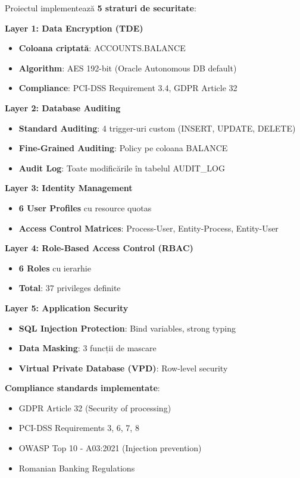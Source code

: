 \documentclass[12pt,a4paper]{article}
\begin{document}
Proiectul implementează \textbf{5 straturi de securitate}:

\textbf{Layer 1: Data Encryption (TDE)}
\begin{itemize}
    \item \textbf{Coloana criptată}: ACCOUNTS.BALANCE
    \item \textbf{Algorithm}: AES 192-bit (Oracle Autonomous DB default)
    \item \textbf{Compliance}: PCI-DSS Requirement 3.4, GDPR Article 32
\end{itemize}

\textbf{Layer 2: Database Auditing}
\begin{itemize}
    \item \textbf{Standard Auditing}: 4 trigger-uri custom (INSERT, UPDATE, DELETE)
    \item \textbf{Fine-Grained Auditing}: Policy pe coloana BALANCE
    \item \textbf{Audit Log}: Toate modificările în tabelul AUDIT\_LOG
\end{itemize}

\textbf{Layer 3: Identity Management}
\begin{itemize}
    \item \textbf{6 User Profiles} cu resource quotas
    \item \textbf{Access Control Matrices}: Process-User, Entity-Process, Entity-User
\end{itemize}

\textbf{Layer 4: Role-Based Access Control (RBAC)}
\begin{itemize}
    \item \textbf{6 Roles} cu ierarhie
    \item \textbf{Total}: 37 privileges definite
\end{itemize}

\textbf{Layer 5: Application Security}
\begin{itemize}
    \item \textbf{SQL Injection Protection}: Bind variables, strong typing
    \item \textbf{Data Masking}: 3 funcții de mascare
    \item \textbf{Virtual Private Database (VPD)}: Row-level security
\end{itemize}

\textbf{Compliance standards implementate}:
\begin{itemize}
    \item[$\checkmark$] GDPR Article 32 (Security of processing)
    \item[$\checkmark$] PCI-DSS Requirements 3, 6, 7, 8
    \item[$\checkmark$] OWASP Top 10 - A03:2021 (Injection prevention)
    \item[$\checkmark$] Romanian Banking Regulations
\end{itemize}
\end{document}
